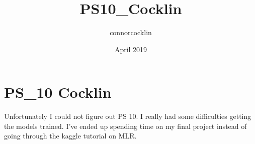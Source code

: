 \documentclass{article}
\title{PS10_Cocklin}
\author{connorcocklin }
\date{April 2019}
\begin{document}
\maketitle

\section{PS_10 Cocklin}
Unfortunately I could not figure out PS 10. I really had some difficulties getting the models trained. I've ended up spending time on my final project instead of going through the kaggle tutorial on MLR. 
\end{document}
